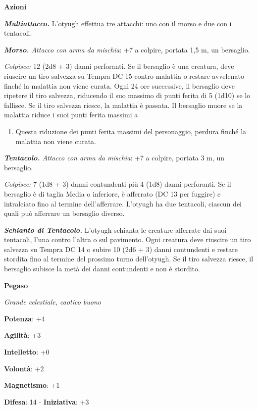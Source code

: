 \begin{multicols}{2}
\textbf{Azioni}

\emph{\textbf{Multiattacco.}} L'otyugh effettua tre attacchi: uno con il
morso e due con i tentacoli.

\emph{\textbf{Morso.} Attacco con arma da mischia}: +7 a colpire,
portata 1,5 m, un bersaglio.

\emph{Colpisce:} 12 (2d8 + 3) danni perforanti. Se il bersaglio è una
creatura, deve riuscire un tiro salvezza su Tempra DC 15 contro
malattia o restare avvelenato finché la malattia non viene curata. Ogni
24 ore successive, il bersaglio deve ripetere il tiro salvezza,
riducendo il suo massimo di punti ferita di 5 (1d10) se lo fallisce. Se
il tiro salvezza riesce, la malattia è passata. Il bersaglio muore se la
malattia riduce i suoi punti ferita massimi a


\begin{enumerate}
\def\labelenumi{\arabic{enumi}.}
\item
  Questa riduzione dei punti ferita massimi del personaggio, perdura
  finché la malattia non viene curata.
\end{enumerate}


\emph{\textbf{Tentacolo.} Attacco con arma da mischia}: +7 a colpire,
portata 3 m, un bersaglio.

\emph{Colpisce:} 7 (1d8 + 3) danni contundenti più 4 (1d8) danni
perforanti. Se il bersaglio è di taglia Media o inferiore, è afferrato
(DC 13 per fuggire) e intralciato fino al termine dell'afferrare.
L'otyugh ha due tentacoli, ciascun dei quali può afferrare un bersaglio
diverso.

\emph{\textbf{Schianto di Tentacolo.}} L'otyugh schianta le creature
afferrate dai suoi tentacoli, l'una contro l'altra o sul pavimento. Ogni
creatura deve riuscire un tiro salvezza su Tempra DC 14 o subire 10 (2d6
+ 3) danni contundenti e restare stordita fino al termine del prossimo
turno dell'otyugh. Se il tiro salvezza riesce, il bersaglio subisce la
metà dei danni contundenti e non è stordito.




\textbf{Pegaso}

\emph{Grande celestiale, caotico buono}

\textbf{Potenza}: +4

\textbf{Agilità}: +3

\textbf{Intelletto}: +0

\textbf{Volontà}: +2

\textbf{Magnetismo}: +1

\textbf{Difesa}: 14 - \textbf{Iniziativa}: +3


\end{multicols}
